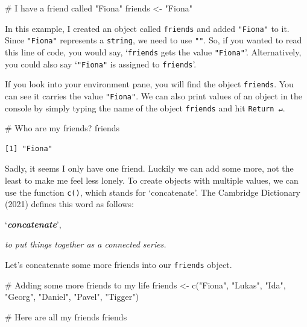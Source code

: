 \documentclass[
  letterpaper,
]{krantz}
\makeatletter
\newenvironment{Shaded}{\begin{snugshade}}{\end{snugshade}}
\newcommand{\CommentTok}[1]{\textcolor[rgb]{0.37,0.37,0.37}{#1}}
\newcommand{\FunctionTok}[1]{\textcolor[rgb]{0.28,0.35,0.67}{#1}}
\newcommand{\NormalTok}[1]{\textcolor[rgb]{0.00,0.23,0.31}{#1}}
\newcommand{\OtherTok}[1]{\textcolor[rgb]{0.00,0.23,0.31}{#1}}
\newcommand{\StringTok}[1]{\textcolor[rgb]{0.13,0.47,0.30}{#1}}
\renewenvironment{quote}{\begin{VF}}{\end{VF}}
\newenvironment{kframe}{%
\medskip{}
\setlength{\fboxsep}{.8em}
 \def\at@end@of@kframe{}%
 \ifinner\ifhmode%
  \def\at@end@of@kframe{\end{minipage}}%
  \begin{minipage}{\columnwidth}%
 \fi\fi%
 \def\FrameCommand##1{\hskip\@totalleftmargin \hskip-\fboxsep
 \colorbox{shadecolor}{##1}\hskip-\fboxsep
     \hskip-\linewidth \hskip-\@totalleftmargin \hskip\columnwidth}%
 \MakeFramed {\advance\hsize-\width
   \@totalleftmargin\z@ \linewidth\hsize
   \@setminipage}}%
 {\par\unskip\endMakeFramed%
 \at@end@of@kframe}
\renewenvironment{Shaded}{\begin{kframe}}{\end{kframe}}
\makeatother
\begin{document}
\begin{Shaded}
\begin{Highlighting}[]
\CommentTok{\# I have a friend called "Fiona"}
\NormalTok{friends }\OtherTok{\textless{}{-}} \StringTok{"Fiona"}
\end{Highlighting}
\end{Shaded}

In this example, I created an object called \texttt{friends} and added
\texttt{"Fiona"} to it. Since \texttt{"Fiona"} represents a
\texttt{string}, we need to use \texttt{""}. So, if you wanted to read
this line of code, you would say, `\texttt{friends} gets the value
\texttt{"Fiona"}'. Alternatively, you could also say `\texttt{"Fiona"}
is assigned to \texttt{friends}'.

If you look into your environment pane, you will find the object
\texttt{friends}. You can see it carries the value \texttt{"Fiona"}. We
can also print values of an object in the console by simply typing the
name of the object \texttt{friends} and hit \texttt{Return\ ↵}.

\begin{Shaded}
\begin{Highlighting}[]
\CommentTok{\# Who are my friends?}
\NormalTok{friends}
\end{Highlighting}
\end{Shaded}

\begin{verbatim}
[1] "Fiona"
\end{verbatim}

Sadly, it seems I only have one friend. Luckily we can add some more,
not the least to make me feel less lonely. To create objects with
multiple values, we can use the function \texttt{c()}, which stands for
`concatenate'. The Cambridge Dictionary (2021) defines this word as
follows:

\begin{quote}
`\textbf{\emph{concatenate}}',

\emph{to put things together as a connected series.}
\end{quote}

Let's concatenate some more friends into our \texttt{friends} object.

\begin{Shaded}
\begin{Highlighting}[]
\CommentTok{\# Adding some more friends to my life}
\NormalTok{friends }\OtherTok{\textless{}{-}} \FunctionTok{c}\NormalTok{(}\StringTok{"Fiona"}\NormalTok{,}
             \StringTok{"Lukas"}\NormalTok{,}
             \StringTok{"Ida"}\NormalTok{,}
             \StringTok{"Georg"}\NormalTok{,}
             \StringTok{"Daniel"}\NormalTok{,}
             \StringTok{"Pavel"}\NormalTok{,}
             \StringTok{"Tigger"}\NormalTok{)}

\CommentTok{\# Here are all my friends}
\NormalTok{friends}
\end{Highlighting}
\end{Shaded}
\end{document}
